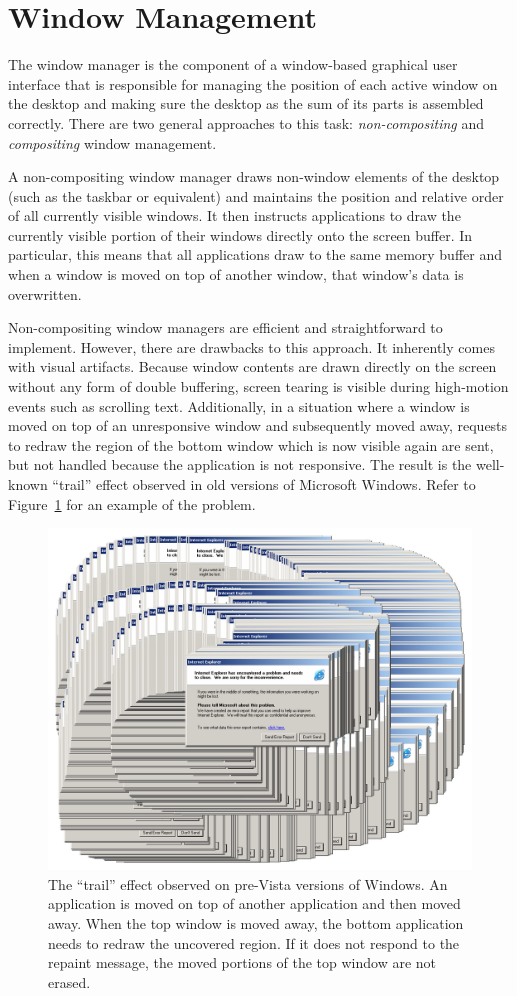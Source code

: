 	\section{Window Management}\label{sec:wm}
			The window manager is the component of a window-based graphical user
			interface that is responsible for managing the position of each active
			window on the desktop and making sure the desktop as the sum of its
			parts is assembled correctly. There are two general approaches to this
			task: \emph{non-compositing} and \emph{compositing} window management.

			A non-compositing window manager draws non-window elements of the
			desktop (such as the taskbar or equivalent) and maintains the
			position and relative order of all currently visible windows. It
			then instructs applications to draw the currently visible portion
			of their windows directly onto the screen buffer. In particular,
			this means that all applications draw to the same memory buffer and
			when a window is moved on top of another window, that window's data
			is overwritten.

			Non-compositing window managers are efficient and
			straightforward to implement. However, there are drawbacks
			to this approach. It inherently comes
			with visual artifacts. Because window contents are drawn
			directly on the screen without any form of double buffering, screen
			tearing is visible during high-motion events such as scrolling
			text. Additionally, in a situation where a window is moved on top
			of an unresponsive window and subsequently moved away, requests to
			redraw the region of the bottom window which is now visible again
			are sent, but not handled because the application is not
			responsive. The result is the well-known \enquote{trail} effect
			observed in old versions of Microsoft Windows. Refer to
			Figure~\ref{fig:trail} for an example of the problem.
			\begin{figure}[h]
				\centering
				\includegraphics[width=0.8\columnwidth]{trail}
				\caption{The \enquote{trail} effect observed on pre-Vista versions
					of Windows. An application is moved on top of another application
					and then moved away. When the top window is moved away, the bottom
					application needs to redraw the uncovered region. If it does not
					respond to the repaint message, the moved portions of the top
					window are not erased.}
				\label{fig:trail}
			\end{figure}

